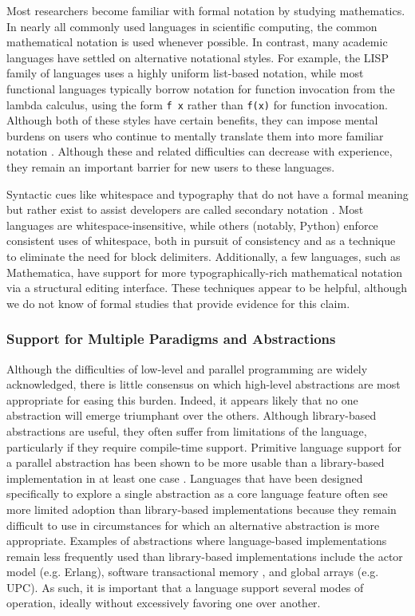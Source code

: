 Most researchers become familiar with formal notation by studying mathematics. In nearly all commonly used languages in scientific computing, the common mathematical notation is used whenever possible. In contrast, many academic languages have settled on alternative notational styles. For example, the LISP family of languages uses a highly uniform list-based notation, while most functional languages typically borrow notation for function invocation from the lambda calculus, using the form \verb|f x| rather than \verb|f(x)| for function invocation. Although both of these styles have certain benefits, they can impose mental burdens on users who continue to mentally translate them into more familiar notation \cite{anderson1985novice}. Although these and related difficulties can decrease with experience, they remain an important barrier for new users to these languages.

Syntactic cues like whitespace and typography that do not have a formal meaning but rather exist to assist developers are called secondary notation \cite{green1990programming}. Most languages are whitespace-insensitive, while others (notably, Python) enforce consistent uses of whitespace, both in pursuit of consistency and as a technique to eliminate the need for block delimiters. Additionally, a few languages, such as Mathematica, have support for more typographically-rich mathematical notation via a structural editing interface. These techniques appear to be helpful, although we do not know of formal studies that provide evidence for this claim.

\subsubsection{Support for Multiple Paradigms and Abstractions}\label{multiparadigm}
Although the difficulties of low-level and parallel programming are widely acknowledged, there is little consensus on which high-level abstractions are most appropriate for easing this burden. Indeed, it appears likely that no one abstraction will emerge triumphant over the others. Although library-based abstractions are useful, they often suffer from limitations of the language, particularly if they require compile-time support. Primitive language support for a parallel abstraction has been shown to be more usable than a library-based implementation in at least one case \cite{cave2010comparing}. 
Languages that have been designed specifically to explore a single abstraction as a core language feature often see more limited adoption than library-based implementations because they remain difficult to use in circumstances for which an alternative abstraction is more appropriate. Examples of abstractions where language-based implementations remain less frequently used than library-based implementations include the actor model (e.g. Erlang), software transactional memory \cite{harris2003language}, and global arrays (e.g. UPC). As such, it is important that a language support several modes of operation, ideally without excessively favoring one over another. 


